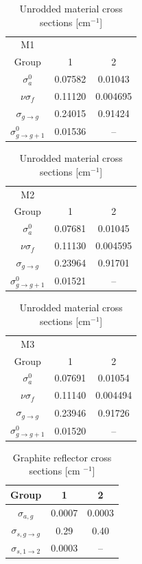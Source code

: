 \documentclass{proposal}
\newcommand{\rarr}{\ensuremath{\rightarrow}}
\begin{document}
\begin{table}
    \centering
    \caption{Unrodded material cross sections [cm$^{-1}$]}\label{tab:xs}
    \begin{tabular}{c|c|c}
        M1  & & \\
        Group & 1 & 2\\
        \hline\hline
        $\sigma_a^0$             &  0.07582& 0.01043 \\
        $\nu\sigma_f$            & 0.11120 &0.004695\\
        $\sigma_{g\rarr g}$     & 0.24015 &0.91424 \\
        $\sigma_{g \rarr g+1}^0$ & 0.01536 & --\\
        \hline
    \end{tabular}

    \begin{tabular}{c|c|c}
        M2 & & \\
        Group & 1 & 2\\
        \hline\hline
        $\sigma_a^0$ & 0.07681 &0.01045 \\
        $\nu\sigma_f$ & 0.11130 & 0.004595\\
        $\sigma_{g\rarr g}$ & 0.23964 & 0.91701\\
        $\sigma_{g \rarr g+1}^0$ & 0.01521& --\\
    \hline
    \end{tabular}

    \begin{tabular}{c|c|c}
        M3 & & \\
        Group & 1 & 2\\
        \hline\hline
        $\sigma_a^0$ & 0.07691 & 0.01054\\
        $\nu\sigma_f$ & 0.11140 & 0.004494\\
        $\sigma_{g\rarr g}$ & 0.23946& 0.91726\\
        $\sigma_{g \rarr g+1}^0$ & 0.01520& --
    \end{tabular}
\end{table}


\begin{table}
    \centering
    \caption{Graphite reflector cross sections [cm $^{-1}$]}\label{tab:test1-graphite}
    \begin{tabular}{c|c|c}
        Group &1 & 2\\
        \hline\hline
        $\sigma_{a, g}$        & 0.0007 & 0.0003 \\
        $\sigma_{s, g\rarr g}$ & 0.29&0.40 \\
        $\sigma_{s, 1\rarr 2}$ & 0.0003 & --\\
        \hline
    \end{tabular}
\end{table}
\end{document}
